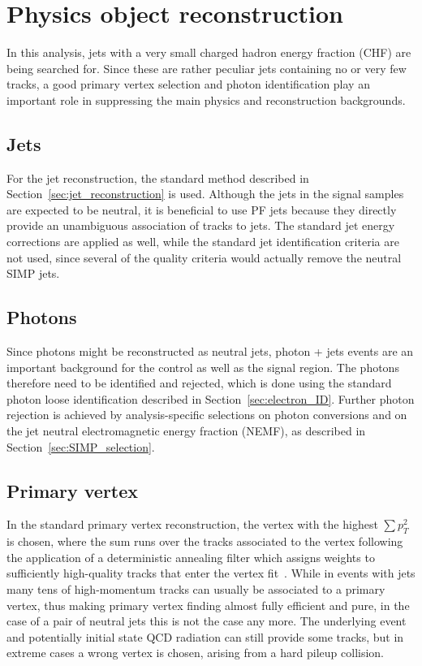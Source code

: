 \section{Physics object reconstruction} 
\label{sec:SIMP_reconstruction}

In this analysis, jets with a very small charged hadron energy fraction (CHF) are being searched for. Since these are rather peculiar jets containing no or very few tracks, a good primary vertex selection and photon identification play an important role in suppressing the main physics and reconstruction backgrounds.

\subsection{Jets}

For the jet reconstruction, the standard method described in Section~\ref{sec:jet_reconstruction} is used. Although the jets in the signal samples are expected to be neutral, it is beneficial to use \ac{PF} jets because they directly provide an unambiguous association of tracks to jets. The standard jet energy corrections are applied as well, while the standard jet identification criteria are not used, since several of the quality criteria would actually remove the neutral \ac{SIMP} jets.

\subsection{Photons}

Since photons might be reconstructed as neutral jets, photon + jets events are an important background for the control as well as the signal region. The photons therefore need to be identified and rejected, which is done using the standard photon loose identification described in Section~\ref{sec:electron_ID}. Further photon rejection is achieved by analysis-specific selections on photon conversions and on the jet neutral electromagnetic energy fraction (NEMF), as described in Section~\ref{sec:SIMP_selection}.

\subsection{Primary vertex}

In the standard primary vertex reconstruction, the vertex with the highest $\sum p_T^2$ is chosen, where the sum runs over the tracks associated to the vertex following the application of a deterministic annealing filter which assigns weights to sufficiently high-quality tracks that enter the vertex fit~\cite{Chatrchyan:2014fea}. While in events with jets many tens of high-momentum tracks can usually be associated to a primary vertex, thus making primary vertex finding almost fully efficient and pure, in the case of a pair of neutral jets this is not the case any more. The underlying event and potentially initial state \acs{QCD} radiation can still provide some tracks, but in extreme cases a wrong vertex is chosen, arising from a hard pileup collision.

